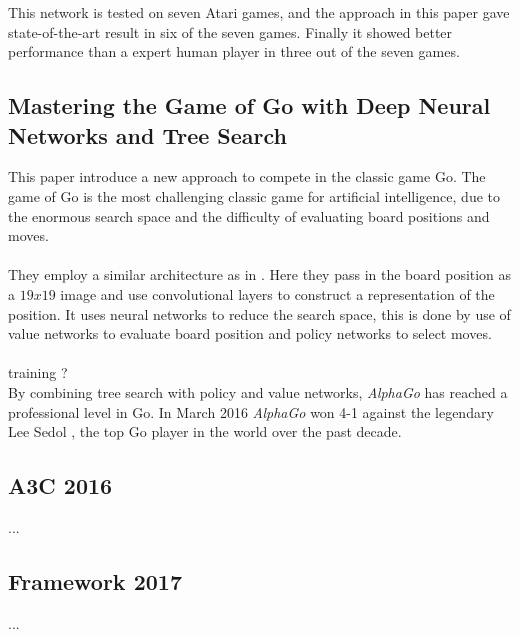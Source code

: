 This network is tested on seven Atari games, and the approach in this paper gave state-of-the-art result in six of the seven games. Finally it showed better performance than a expert human player in three out of the seven games.  

\subsection{Mastering the Game of Go with Deep Neural Networks and Tree Search}\cite{Silver_2016}
This paper introduce a new approach to compete in the classic game Go. The game of Go is the most challenging classic game for artificial intelligence, due to the enormous search space and the difficulty of evaluating board positions and moves. \\
\\
They employ a similar architecture as in \cite{DBLP:journals/corr/MnihKSGAWR13}. Here they pass in the board position as a $19 x 19$ image and use convolutional layers to construct a representation of the position. It uses neural networks to reduce the search space, this is done by use of value networks to evaluate board position and policy networks to select moves.\\
\\
training ? 
\\
By combining tree search with policy and value networks, \textit{AlphaGo} has reached a professional level in Go. In March 2016 \textit{AlphaGo} won 4-1 against the legendary Lee Sedol , the top Go player in the world over the past decade.  

\subsection{A3C 2016}
...
\subsection{Framework 2017}
...